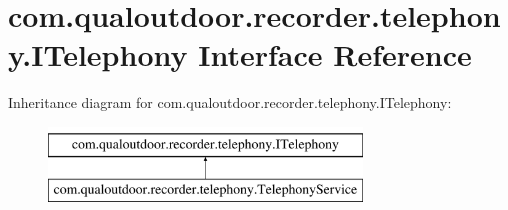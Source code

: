 \hypertarget{interfacecom_1_1qualoutdoor_1_1recorder_1_1telephony_1_1ITelephony}{\section{com.\-qualoutdoor.\-recorder.\-telephony.\-I\-Telephony Interface Reference}
\label{interfacecom_1_1qualoutdoor_1_1recorder_1_1telephony_1_1ITelephony}
}
Inheritance diagram for com.\-qualoutdoor.\-recorder.\-telephony.\-I\-Telephony\-:\begin{figure}[H]
\begin{center}
\leavevmode
\includegraphics[height=2.000000cm]{interfacecom_1_1qualoutdoor_1_1recorder_1_1telephony_1_1ITelephony}
\end{center}
\end{figure}
